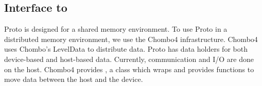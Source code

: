 \documentclass[12pt]{article}
\begin{document}
\subsection{Interface to }

Proto is designed for a shared memory environment.  To use Proto in a distributed memory environment, we use the Chombo4 infrastructure.  Chombo4 uses Chombo’s LevelData to distribute data. Proto has data holders for both device-based and host-based data.    Currently, communication and I/O are done on the host.   Chombo4 provides , a class which wraps    and provides functions to move data between the host and the device. 

%
%
%
%
%
%
%
%
%
\end{document}
